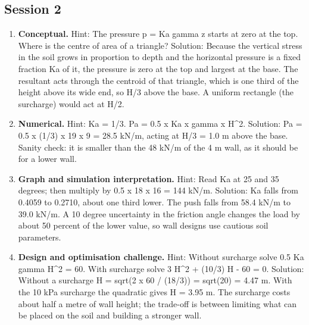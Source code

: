 \documentclass[11pt,a4paper]{article}
\begin{document}
\subsection*{Session 2}
\begin{enumerate}[nosep]
\item \textbf{Conceptual.} Hint: The pressure p = Ka gamma z starts at zero at the top. Where is the centre of area of a triangle? Solution: Because the vertical stress in the soil grows in proportion to depth and the horizontal pressure is a fixed fraction Ka of it, the pressure is zero at the top and largest at the base. The resultant acts through the centroid of that triangle, which is one third of the height above its wide end, so H/3 above the base. A uniform rectangle (the surcharge) would act at H/2.
\item \textbf{Numerical.} Hint: Ka = 1/3. Pa = 0.5 x Ka x gamma x H\textasciicircum{}2. Solution: Pa = 0.5 x (1/3) x 19 x 9 = 28.5 kN/m, acting at H/3 = 1.0 m above the base. Sanity check: it is smaller than the 48 kN/m of the 4 m wall, as it should be for a lower wall.
\item \textbf{Graph and simulation interpretation.} Hint: Read Ka at 25 and 35 degrees; then multiply by 0.5 x 18 x 16 = 144 kN/m. Solution: Ka falls from 0.4059 to 0.2710, about one third lower. The push falls from 58.4 kN/m to 39.0 kN/m. A 10 degree uncertainty in the friction angle changes the load by about 50 percent of the lower value, so wall designs use cautious soil parameters.
\item \textbf{Design and optimisation challenge.} Hint: Without surcharge solve 0.5 Ka gamma H\textasciicircum{}2 = 60. With surcharge solve 3 H\textasciicircum{}2 + (10/3) H - 60 = 0. Solution: Without a surcharge H = sqrt(2 x 60 / (18/3)) = sqrt(20) = 4.47 m. With the 10 kPa surcharge the quadratic gives H = 3.95 m. The surcharge costs about half a metre of wall height; the trade-off is between limiting what can be placed on the soil and building a stronger wall.
\end{enumerate}
\end{document}
